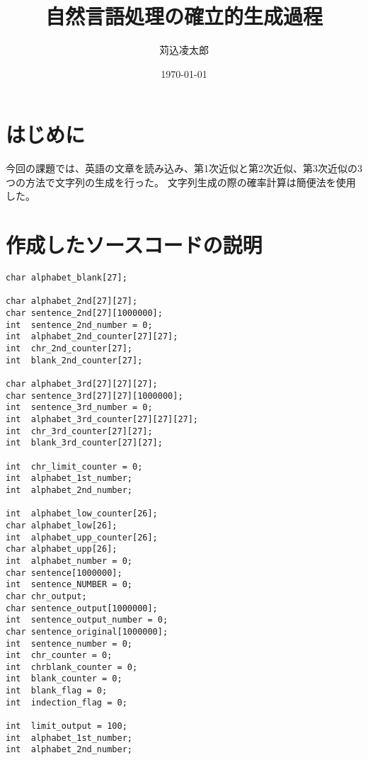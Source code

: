 \documentclass{jarticle}
\title{自然言語処理の確立的生成過程}
\author{苅込凌太郎}
\date{\today}
\begin{document}
\maketitle

\section{はじめに}
今回の課題では、英語の文章を読み込み、第1次近似と第2次近似、第3次近似の3つの方法で文字列の生成を行った。
文字列生成の際の確率計算は簡便法を使用した。

\section{作成したソースコードの説明}
\begin{lstlisting}
char alphabet_blank[27];

char alphabet_2nd[27][27];
char sentence_2nd[27][1000000];
int  sentence_2nd_number = 0;
int  alphabet_2nd_counter[27][27];
int  chr_2nd_counter[27];
int  blank_2nd_counter[27];

char alphabet_3rd[27][27][27];
char sentence_3rd[27][27][1000000];
int  sentence_3rd_number = 0;
int  alphabet_3rd_counter[27][27][27];
int  chr_3rd_counter[27][27];
int  blank_3rd_counter[27][27];

int  chr_limit_counter = 0;
int  alphabet_1st_number;
int  alphabet_2nd_number;

int  alphabet_low_counter[26];
char alphabet_low[26];
int  alphabet_upp_counter[26];
char alphabet_upp[26];
int  alphabet_number = 0;
char sentence[1000000];
int  sentence_NUMBER = 0;
char chr_output;
char sentence_output[1000000];
int  sentence_output_number = 0;
char sentence_original[1000000];
int  sentence_number = 0;
int  chr_counter = 0;
int  chrblank_counter = 0;
int  blank_counter = 0;
int  blank_flag = 0;
int  indection_flag = 0;

int  limit_output = 100;
int  alphabet_1st_number;
int  alphabet_2nd_number;
\end{lstlisting}
\end{document}
